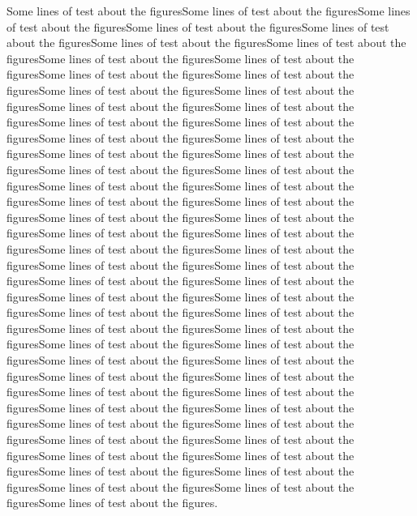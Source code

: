 Some lines of test about the figuresSome lines of test about the figuresSome lines of test about the figuresSome lines of test about the figuresSome lines of test about the figuresSome lines of test about the figuresSome lines of test about the figuresSome lines of test about the figuresSome lines of test about the figuresSome lines of test about the figuresSome lines of test about the figuresSome lines of test about the figuresSome lines of test about the figuresSome lines of test about the figuresSome lines of test about the figuresSome lines of test about the figuresSome lines of test about the figuresSome lines of test about the figuresSome lines of test about the figuresSome lines of test about the figuresSome lines of test about the figuresSome lines of test about the figuresSome lines of test about the figuresSome lines of test about the figuresSome lines of test about the figuresSome lines of test about the figuresSome lines of test about the figuresSome lines of test about the figuresSome lines of test about the figuresSome lines of test about the figuresSome lines of test about the figuresSome lines of test about the figuresSome lines of test about the figuresSome lines of test about the figuresSome lines of test about the figuresSome lines of test about the figuresSome lines of test about the figuresSome lines of test about the figuresSome lines of test about the figuresSome lines of test about the figuresSome lines of test about the figuresSome lines of test about the figuresSome lines of test about the figuresSome lines of test about the figuresSome lines of test about the figuresSome lines of test about the figuresSome lines of test about the figuresSome lines of test about the figuresSome lines of test about the figuresSome lines of test about the figuresSome lines of test about the figuresSome lines of test about the figuresSome lines of test about the figuresSome lines of test about the figuresSome lines of test about the figuresSome lines of test about the figuresSome lines of test about the figuresSome lines of test about the figuresSome lines of test about the figuresSome lines of test about the figuresSome lines of test about the figuresSome lines of test about the figuresSome lines of test about the figuresSome lines of test about the figures.

